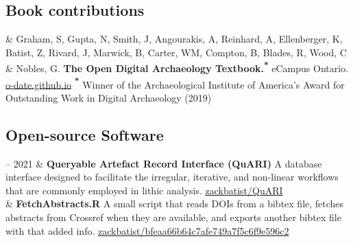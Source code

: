 \documentclass[11pt, a4paper]{article}
\newcommand{\LastName}{Batist}
\newcommand{\Initials}{Z}
\newcommand{\Me}{\LastName, \Initials}  %
\newcommand{\MichaelCarter}{Carter, WM}
\newcommand{\ShawnGraham}{Graham, S}
\newcommand{\NehaGupta}{Gupta, N}
\newcommand{\JoleneSmith}{Smith, J}
\newcommand{\AndreasAngourakis}{Angourakis, A}
\newcommand{\AndrewReinhard}{Reinhard, A}
\newcommand{\KateEllenberger}{Ellenberger, K}
\newcommand{\JoelRivard}{Rivard, J}
\newcommand{\BenMarwick}{Marwick, B}
\newcommand{\BethCompton}{Compton, B}
\newcommand{\RobBlades}{Blades, R}
\newcommand{\CristinaWood}{Wood, C}
\newcommand{\GaryNobles}{Nobles, G}
\newcommand{\DOI}[1]{\newline \aiDoi\ \href{https://doi.org/#1}{#1}}
\newcommand{\GitHub}[1]{\newline \faGithub \href{https://github.com/#1}{#1}}
\newcommand{\Gist}[1]{\newline \faGithub \href{https://gist.github.com/#1}{#1}}
\newcommand{\Website}[1]{\newline \faGlobe \href{https://#1}{#1}}
\newcommand{\Duration}[2]{\fontsize{10pt}{0}\selectfont #1 -- #2}
\newcommand{\Year}[1]{\fontsize{10pt}{0}\selectfont #1}
\begin{document}
\subsection{Book contributions}
\begin{EntriesTable}
\Year{2018}  &
  \ShawnGraham, \NehaGupta, \JoleneSmith, \AndreasAngourakis, \AndrewReinhard, \KateEllenberger, \Me, \JoelRivard, \BenMarwick, \MichaelCarter, \BethCompton, \RobBlades, \CristinaWood { \&} \GaryNobles.
  \textbf{The Open Digital Archaeology Textbook.\textsuperscript{*}}
  eCampus Ontario.
  \Website{o-date.github.io}\newline
  \textbf{\textsuperscript{*}} Winner of the Archaeological Institute of America's Award for Outstanding Work in Digital Archaeology (2019)
\end{EntriesTable}


\subsection{Open-source Software}

\begin{EntriesTable}
  \Duration{2020}{2021} &
  \textbf{Queryable Artefact Record Interface (QuARI)}
  \newline
  A database interface designed to facilitate the irregular, iterative, and non-linear workflows that are commonly employed in lithic analysis.
  \GitHub{zackbatist/QuARI}
  \\
  \Year{2018} &
  \textbf{FetchAbstracts.R}
  \newline
  A small script that reads DOIs from a bibtex file, fetches abstracts from Crossref when they are available, and exports another bibtex file with that added info.
  \Gist{zackbatist/bfeaa66b64c7afe749a7f5c6f9e596c2}
  \\

\end{EntriesTable}
\end{document}
